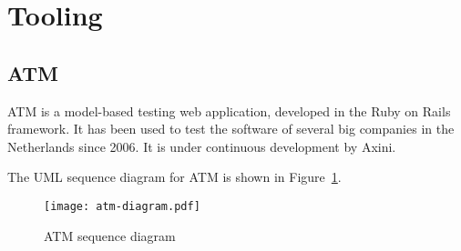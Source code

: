 \section{Tooling}\label{sec:tooling}

\subsection{ATM}\label{sec:atm}
ATM is a model-based testing web application, developed in the Ruby on Rails framework. It has been used to test the software of several big companies in the Netherlands since 2006. It is under continuous development by Axini.

The UML sequence diagram for ATM is shown in Figure~\ref{fig:axini_tool}.

\begin{figure}[h]
  \begin{center}
    \texttt{[image: atm-diagram.pdf]}
  \end{center}
  \caption{ATM sequence diagram}
  \label{fig:axini_tool}
\end{figure}

